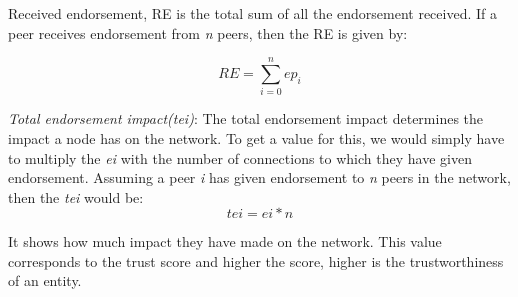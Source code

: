 Received endorsement, RE is the total sum of all the endorsement received.
If a peer receives endorsement from \textit{n} peers, then the RE is given by: 

\begin{equation}
	RE = \sum_{i=0}^{n}ep_{i}
\end{equation}

\textit{Total endorsement impact(tei)}: The total endorsement impact determines the 
impact a node has on the network. To get a value for this, we would simply have to 
multiply the \textit{ei} with the number of connections to which they have given
endorsement. Assuming a peer \textit{i} has given endorsement to \textit{n} 
peers in the network, then the \textit{tei} would be: 
\begin{equation}
	tei = ei * n 
\end{equation}

It shows how much impact they have made on the network. This value corresponds to 
the trust score and higher the score, higher is the trustworthiness of an entity.

 
 
 
 
 
 
 
 
 
 









